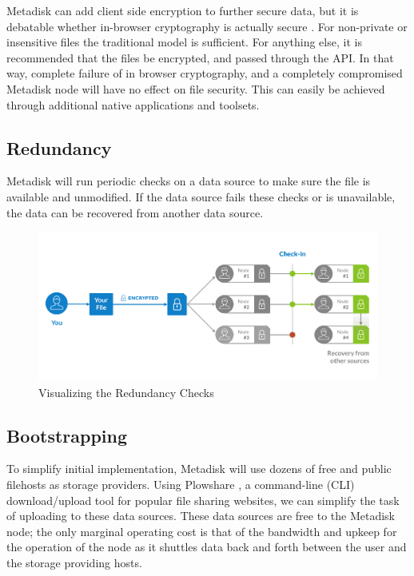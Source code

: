 \documentclass[a4paper,12pt]{article}
\begin{document}
Metadisk can add client side encryption to further secure data, but it is debatable whether in-browser cryptography is actually secure \cite{5}. For non-private or insensitive files the traditional model is sufficient. For anything else, it is recommended that the files be encrypted, and passed through the API. In that way, complete failure of in browser cryptography, and a completely compromised Metadisk node will have no effect on file security. This can easily be achieved through additional native applications and toolsets.   

\subsection*{Redundancy}

Metadisk will run periodic checks on a data source to make sure the file is available and unmodified. If the data source fails these checks or is unavailable, the data can be recovered from another data source.
 
\begin{figure}[h!]
  \centering
      \includegraphics[width=\linewidth]{03}
  \caption{Visualizing the Redundancy Checks }
\end{figure}

\subsection*{Bootstrapping}

To simplify initial implementation, Metadisk will use dozens of free and public filehosts as storage providers. Using Plowshare \cite{6}, a command-line (CLI) download/upload tool for popular file sharing websites, we can simplify the task of uploading to these data sources.  These data sources are free to the Metadisk node; the only marginal operating cost is that of the bandwidth and upkeep for the operation of the node as it shuttles data back and forth between the user and the storage providing hosts. \\
\end{document}

